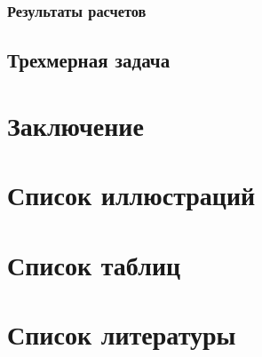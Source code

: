 \documentclass[12pt,a4paper, titlepage, openany]{book}
\begin{document}
\subsection*{Результаты расчетов}

\section*{Трехмерная задача}

\chapter*{Заключение}

\chapter*{Список иллюстраций}

\chapter*{Список таблиц}

\chapter*{Список литературы}
\end{document}
